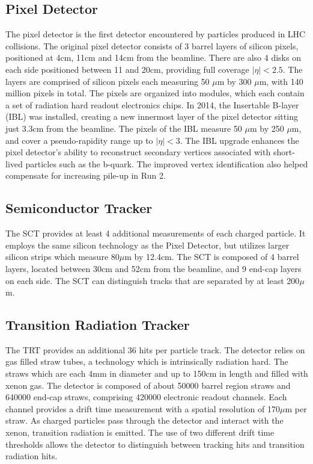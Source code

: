\subsection{Pixel Detector}
The pixel detector is the first detector encountered by particles produced in LHC collisions. The original pixel detector consists of 3 barrel layers of silicon pixels, positioned at 4cm, 11cm and 14cm from the beamline. There are also 4 disks on each side positioned between 11 and 20cm, providing full coverage $|\eta| < 2.5$. The layers are comprised of silicon pixels each measuring 50 $\mu$m by 300 $\mu$m, with 140 million pixels in total. The pixels are organized into modules, which each contain a set of radiation hard readout electronics chips. In 2014, the Insertable B-layer (IBL) was installed, creating a new innermost layer of the pixel detector sitting just 3.3cm from the beamline. The pixels of the IBL measure 50 $\mu$m by 250 $\mu$m, and cover a pseudo-rapidity range up to $|\eta| < 3$. The IBL upgrade enhances the pixel detector's ability to reconstruct secondary vertices associated with short-lived particles such as the b-quark. The improved vertex identification also helped compensate for increasing pile-up in Run 2. 

\subsection{Semiconductor Tracker}
The SCT provides at least 4 additional measurements of each charged particle. It employs the same silicon technology as the Pixel Detector, but utilizes larger silicon strips which measure 80$\mu$m by 12.4cm. The SCT is composed of 4 barrel layers, located between 30cm and 52cm from the beamline, and 9 end-cap layers on each side. The SCT can distinguish tracks that are separated by at least 200$\mu$m.

\subsection{Transition Radiation Tracker}
The TRT provides an additional 36 hits per particle track. The detector relies on gas filled straw tubes, a technology which is intrinsically radiation hard. The straws which are each 4mm in diameter and up to 150cm in length and filled with xenon gas. The detector is composed of about 50000 barrel region straws and 640000 end-cap straws, comprising 420000 electronic readout channels. Each channel provides a drift time measurement with a spatial resolution of 170$\mu$m per straw. As charged particles pass through the detector and interact with the xenon, transition radiation is emitted. The use of two different drift time thresholds allows the detector to distinguish between tracking hits and transition radiation hits. 

